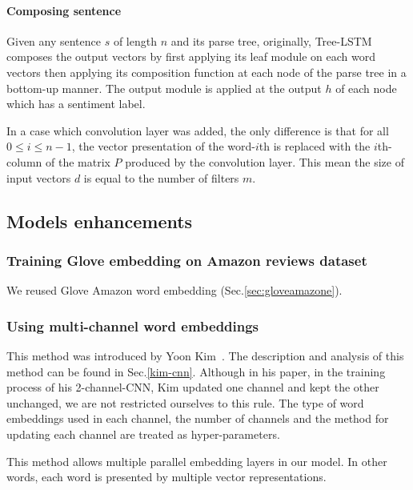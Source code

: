 \paragraph{Composing sentence}
Given any sentence \({s}\) of length \({n}\) and its parse tree, originally, Tree-LSTM composes the output vectors by first applying its leaf module on each word vectors then applying its composition function at each node of the parse tree in a bottom-up manner.
The output module is applied at the output \({h}\) of each node which has a sentiment label.

In a case which convolution layer was added, the only difference is that for all \(0 \leq i \leq n-1\), the vector presentation of the word-\({i}\)th is replaced with the \({i}\)th-column of the matrix \({P}\) produced by the convolution layer.
This mean the size of input vectors \(d\) is equal to the number of filters \(m\).
 
\subsection{Models enhancements}\label{sec:model-enhan}
\subsubsection{Training Glove embedding on Amazon reviews dataset}\label{sec:reuse-glove-amazon}
We reused Glove Amazon word embedding (Sec.\ref{sec:gloveamazone}).

\subsubsection{Using multi-channel word embeddings}\label{sec:enhan-multi-channel}
This method was introduced by Yoon Kim~\cite{KimCNN}.
The description and analysis of this method can be found in Sec.\ref{kim-cnn}.
Although in his paper, in the training process of his 2-channel-CNN, Kim updated one channel and kept the other unchanged, we are not restricted ourselves to this rule.
The type of word embeddings used in each channel, the number of channels and the method for updating each channel are treated as hyper-parameters.

This method allows multiple parallel embedding layers in our model.
In other words, each word is presented by multiple vector representations.

